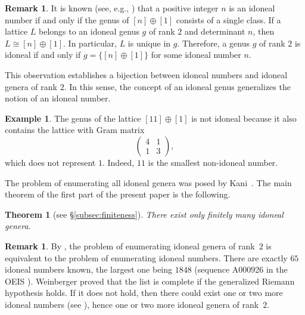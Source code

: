 \documentclass[a4paper]{amsart}
\theoremstyle{definition}
\newtheorem{example}[definition]{Example}
\newtheorem{remark}[definition]{Remark}
\theoremstyle{plain}
\newtheorem{theorem}[definition]{Theorem}
\begin{document}
\begin{remark} \label{rmk:idoneal}
It is known (see, e.g., \cite[Theorem 6]{Kani:idoneal.numbers}) that a positive integer \(n\) is an idoneal number if and only if the genus of \([n] \oplus [1]\) consists of a single class.
If a lattice \(L\) belongs to an idoneal genus \(g\) of rank \(2\) and determinant \(n\), then \(L \cong [n] \oplus [1]\). In particular, \(L\) is unique in \(g\).  
Therefore, a genus \(g\) of rank \(2\) is idoneal if and only if \(g = \{ [n] \oplus [1] \}\) for some idoneal number \(n\).  

This observation establishes a bijection between idoneal numbers and idoneal genera of rank \(2\). In this sense, the concept of an idoneal genus generalizes the notion of an idoneal number.
\end{remark}


\begin{example}
    The genus of the lattice \([11] \oplus [1]\) is not idoneal because it also contains the lattice with Gram matrix
    \[
        \begin{pmatrix} 4 & 1 \\ 1 & 3 \end{pmatrix},
    \]
    which does not represent \(1\). Indeed, \(11\) is the smallest non-idoneal number.
\end{example}

The problem of enumerating all idoneal genera was posed by Kani~\cite[Problem~45]{Kani:idoneal.numbers}.
The main theorem of the first part of the present paper is the following. 

\begin{theorem}[see §\ref{subsec:finiteness}] \label{thm:idoneal}
    There exist only finitely many idoneal genera.
\end{theorem}

\begin{remark} \label{rmk:GRH}
    By , the problem of enumerating idoneal genera of rank~\(2\) is equivalent to the problem of enumerating idoneal numbers. 
    There are exactly \(65\) idoneal numbers known, the largest one being \(1848\) (sequence A000926 in the OEIS \cite{OEIS:A000926}).
    Weinberger \cite{weinberger} proved that the list is complete if the generalized Riemann hypothesis holds.
    If it does not hold, then there could exist one or two more idoneal numbers (see \cite[Corollary~23]{Kani:idoneal.numbers}), hence one or two more idoneal genera of rank~\(2\).
\end{remark}
\end{document}
